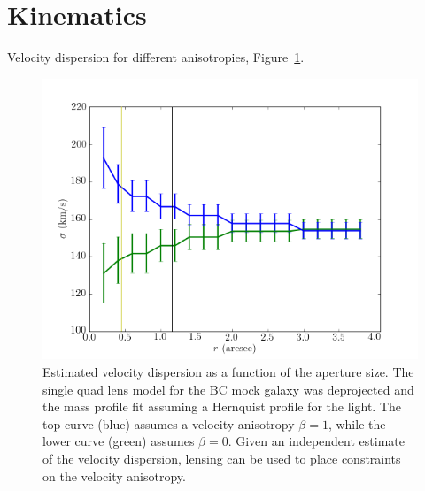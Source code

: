 \documentclass[usenatbib,onecolumn,galley]{mn2e}
\newcommand{\figref}[1] {Figure~\ref{#1}}
\begin{document}
\section{Kinematics}

Velocity dispersion for different anisotropies, \figref{sigma-beta}.

\begin{figure}
\begin{center}
\includegraphics[width=.7\columnwidth]{BCQuadR1a_TmS-sb.pdf}
\end{center}
\caption{Estimated velocity dispersion as a function of the aperture
  size. The single quad lens model for the BC mock galaxy was
  deprojected and the mass profile fit assuming a Hernquist profile
  for the light. The top curve (blue) assumes a velocity anisotropy
  $\beta=1$, while the lower curve (green) assumes $\beta=0$. Given an
  independent estimate of the velocity dispersion, lensing can be used
  to place constraints on the velocity anisotropy.}
\label{sigma-beta}
\end{figure}




\def\aap{A\&A}
\def\araa{ARA\&A}
\def\mnras{MNRAS}
\def\nat{Nature}
\def\nar{New Astr Rev}

\end{document}
